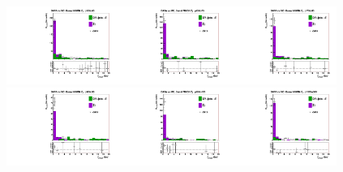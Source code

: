 \begin{figure}[htb]
\begin{center}
\includegraphics[width=0.32\textwidth]{../figs/figs_v11/MUON_ZGamma/PrepareYields/c_TotalDATAvsMC_Barrel__phoPFChIsoCorrFSR_EXCLUDED_pt55to65_.pdf}\includegraphics[width=0.32\textwidth]{../figs/figs_v11/MUON_ZGamma/PrepareYields/c_TotalDATAvsMC_Barrel__phoPFChIsoCorrFSR_EXCLUDED_pt65to75_.pdf}\includegraphics[width=0.32\textwidth]{../figs/figs_v11/MUON_ZGamma/PrepareYields/c_TotalDATAvsMC_Barrel__phoPFChIsoCorrFSR_EXCLUDED_pt75to85_.pdf}\\
\includegraphics[width=0.32\textwidth]{../figs/figs_v11/MUON_ZGamma/PrepareYields/c_TotalDATAvsMC_Barrel__phoPFChIsoCorrFSR_EXCLUDED_pt85to95_.pdf}\includegraphics[width=0.32\textwidth]{../figs/figs_v11/MUON_ZGamma/PrepareYields/c_TotalDATAvsMC_Barrel__phoPFChIsoCorrFSR_EXCLUDED_pt95to120_.pdf}\includegraphics[width=0.32\textwidth]{../figs/figs_v11/MUON_ZGamma/PrepareYields/c_TotalDATAvsMC_Barrel__phoPFChIsoCorrFSR_EXCLUDED_pt120to500_.pdf}\\

\end{center}
\end{figure}
